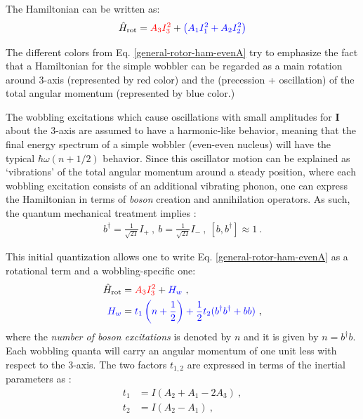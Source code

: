 The Hamiltonian can be written as:
\begin{align}
    \hat{H}_\text{rot}={\color{red}A_3I_3^2}+{\color{blue}\left(A_1I_1^2+A_2I_2^2\right)}
    \label{general-rotor-ham-evenA}
\end{align}

The different colors from Eq. \ref{general-rotor-ham-evenA} try to emphasize the fact that a Hamiltonian for the simple wobbler can be regarded as a main rotation around $3$-axis (represented by {\color{red}red color}) and the (precession + oscillation) of the total angular momentum (represented by {\color{blue}blue} color.)

The wobbling excitations which cause oscillations with small amplitudes for $\mathbf{I}$ about the $3$-axis are assumed to have a harmonic-like behavior, meaning that the final energy spectrum of a simple wobbler (even-even nucleus) will have the typical $\hbar\omega(n+1/2)$ behavior. Since this oscillator motion can be explained as `vibrations' of the total angular momentum around a steady position, where each wobbling excitation consists of an additional vibrating phonon, one can express the Hamiltonian in terms of \emph{boson} creation and annihilation operators. As such, the quantum mechanical treatment implies \cite{bohr1998nuclear}:
\begin{align}
    b^\dagger=\frac{1}{\sqrt{2I}}I_+\ ,\ b=\frac{1}{\sqrt{2I}}I_-\ ,\ \left[b,b^\dagger\right]\approx 1\ .
\end{align}

This initial quantization allows one to write Eq. \ref{general-rotor-ham-evenA} as a rotational term and a wobbling-specific one:
\begin{align}
    \hat{H}_\text{rot}&={\color{red}A_3I_3^2}+{\color{blue}H_w}\ ,\\
    {\color{blue}H_w}&={\color{blue}t_1\left(n+\frac{1}{2}\right)+\frac{1}{2}t_2(b^\dagger b^\dagger + bb)}\ ,
    \label{wob-ham-non-diagonal}
\end{align}
where the \emph{number of boson excitations} is denoted by $n$ and it is given by $n=b^\dagger b$. Each wobbling quanta will carry an angular momentum of one unit less with respect to the $3$-axis. The two factors $t_{1,2}$ are expressed in terms of the inertial parameters as \cite{bohr1998nuclear}:
\begin{align}
    t_1&=I(A_2+A_1-2A_3)\ , \\
    t_2&=I(A_2-A_1)\ ,
\end{align}

